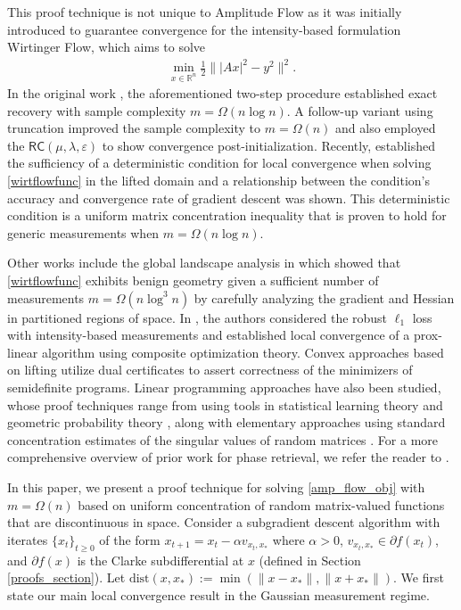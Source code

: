 \documentclass[11pt]{article}
\newcommand{\R}{\mathbb{R}}
\newcommand{\RC}{\mathsf{R}\mathsf{C}}
\newcommand{\al}{\alpha}
\renewcommand{\epsilon}{\varepsilon}
\newcommand{\dist}{\text{dist}}
\begin{document}
This proof technique is not unique to Amplitude Flow as it was initially introduced to guarantee convergence for the intensity-based formulation Wirtinger Flow, which aims to solve  \begin{align}
    \min_{x \in \R^n} \frac{1}{2}\big\||Ax|^2 - y^2\big\|^2. \label{wirtflowfunc}
\end{align} In the original work \cite{CandesLiSoltan2015}, the aforementioned two-step procedure established exact recovery with sample complexity $m = \Omega(n\log n)$. A follow-up variant using truncation \cite{ChenCandes2015} improved the sample complexity to $m = \Omega(n)$ and also employed the $\RC(\mu,\lambda,\epsilon)$ to show convergence post-initialization. Recently, \cite{YonelYazici2020} established the sufficiency of a deterministic condition for local convergence when solving \eqref{wirtflowfunc} in the lifted domain and a relationship between the condition's accuracy and convergence rate of gradient descent was shown. This deterministic condition is a uniform matrix concentration inequality that is proven to hold for generic measurements when $m = \Omega(n \log n)$. 

Other works include the global landscape analysis in \cite{Wright2016} which showed that \eqref{wirtflowfunc} exhibits benign geometry given a sufficient number of measurements $m = \Omega(n \log^3 n)$ by carefully analyzing the gradient and Hessian in partitioned regions of space. In \cite{DuchiRuan2018}, the authors considered the robust $\ell_1$ loss with intensity-based measurements and established local convergence of a prox-linear algorithm using composite optimization theory. Convex approaches based on lifting \cite{CSV2013, CandLi2014, DemanetHand14, Hand17} utilize dual certificates to assert correctness of the minimizers of semidefinite programs. Linear programming approaches have also been studied, whose proof techniques range from using tools in statistical learning theory \cite{BahmRomConvPR} and geometric probability theory \cite{Phasemax}, along with elementary approaches using standard concentration estimates of the singular values of random matrices \cite{HV16Elem}. For a more comprehensive overview of prior work for phase retrieval, we refer the reader to \cite{Numerics_of_PR}.

In this paper, we present a proof technique for solving \eqref{amp_flow_obj} with $m = \Omega(n)$ based on uniform concentration of random matrix-valued functions that are discontinuous in space. Consider a subgradient descent algorithm with iterates $\{x_t\}_{t \geqslant 0}$ of the form $x_{t+1} = x_t - \al v_{x_t,x_*}$ where $\al > 0$, $v_{x_t,x_*} \in \partial f(x_t)$, and $\partial f(x)$ is the Clarke subdifferential at $x$ (defined in Section \ref{proofs_section}). Let $\dist(x,x_*) := \min(\|x-x_*\|,\|x+x_*\|).$ We first state our main local convergence result in the Gaussian measurement regime. 
\end{document}
